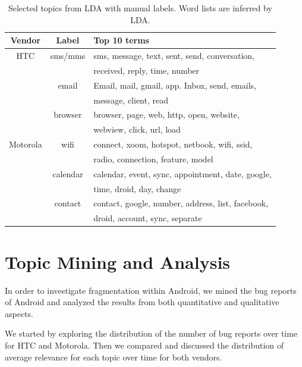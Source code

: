 \documentclass[10pt, conference, compsocconf]{IEEEtran}
\begin{document}
\begin{table}[!t]
\renewcommand{\arraystretch}{1.3}
\caption{Selected topics from LDA with manual labels. Word lists are inferred by LDA.}
\label{seleted2}
\centering
\begin{tabular}{|c||c||l|}
\hline
Vendor & Label & Top 10 terms\\
\hline
HTC & sms\//mms &sms, message, text, sent, send, conversation, \\
            && received, reply, time, number \\ \cline{2-3}
  & email & Email, mail, gmail, app. Inbox, send, emails, \\
            &&message, client, read \\ \cline{2-3}
  & browser&browser, page, web, http, open, website, \\
            &&webview, click, url, load\\
\hline
Motorola & wifi &connect, xoom, hotspot, netbook, wifi, ssid, \\
           &&radio, connection, feature, model\\ \cline{2-3}
    &calendar& calendar, event, sync, appointment, date, google, \\
           &&time, droid, day, change \\ \cline{2-3}
    &contact & contact, google, number, address, list, facebook, \\
           &&droid, account, sync, separate \\
\hline
\end{tabular}
\end{table}


\section{Topic Mining and Analysis}
\label{sec:topicanalysis}

In order to investigate fragmentation within Android, we mined the bug reports of Android and analyzed the results from both quantitative and qualitative aspects.

We started by exploring the distribution of the number of bug reports over time for HTC and Motorola. Then we compared and discussed the distribution of average relevance for each topic over time for both vendors.
\end{document}
